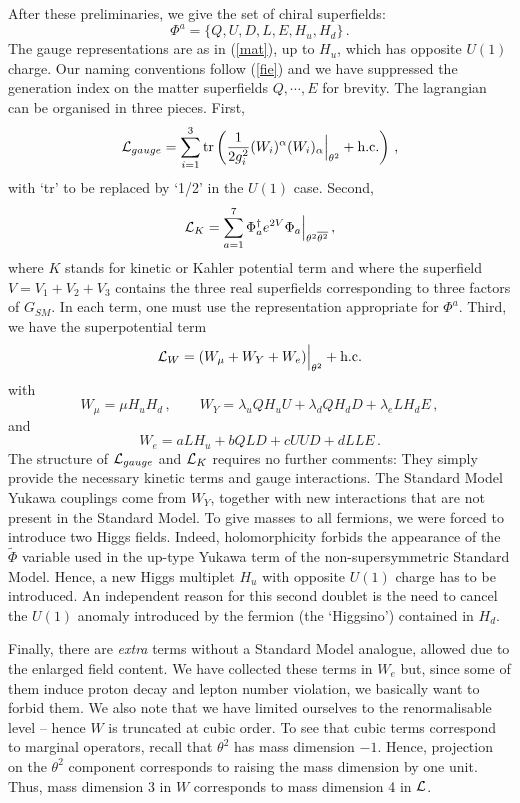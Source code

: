 \documentclass[12pt]{article}
\newcommand{\be}{\begin{equation}}
\newcommand{\ee}{\end{equation}}
\newcommand{\ol}{\overline}
\numberwithin{equation}{section}
\begin{document}
After these preliminaries, we give the set of chiral superfields:
\be
\Phi^a=\{Q,U,D,L,E,H_u,H_d\}\,.
\ee
The gauge representations are as in (\ref{mat}), up to $H_u$, which has opposite $U(1)$ charge. Our naming conventions follow (\ref{fie}) and we have suppressed the generation index on the matter superfields $Q,\cdots\!,E$ for brevity. The lagrangian can be organised in three pieces. First,
\be
{\cal L}_{gauge}=\sum_{i=1}^3\mbox{tr}\left(\frac{1}{2g_i^2}(W_i)^\alpha (W_i)_\alpha\Big|_{\theta^2}+\mbox{h.c.}
\right)\,,
\ee
with `tr' to be replaced by `1/2' in the $U(1)$ case. Second,
\be
{\cal L}_K=\sum_{a=1}^7\Phi_a^\dagger e^{2V}\Phi_a\Big|_{\theta^2\ol{\theta^2}}
\,,
\ee
where $K$ stands for kinetic or Kahler potential term and where the superfield $V=V_1+V_2+V_3$ contains the three real superfields corresponding to three factors of $G_{SM}$. In each term, one must use the representation appropriate for $\Phi^a$. Third, we have the superpotential term
\be 
{\cal L}_W=(W_\mu+W_Y+W_e)\Big|_{\theta^2}+\mbox{h.c.}
\ee
with
\be
W_\mu=\mu H_u H_d\,,\qquad W_Y=\lambda_uQH_uU+\lambda_d QH_dD+\lambda_eLH_dE\,,
\ee
and
\be
W_e=aLH_u+bQLD+cUUD+dLLE\,.
\ee
The structure of ${\cal L}_{gauge}$ and ${\cal L}_K$ requires no further comments: They simply provide the necessary kinetic terms and gauge interactions. The Standard Model Yukawa couplings come from $W_Y$, together with new interactions that are not present in the Standard Model. To give masses to all fermions, we were forced to introduce two Higgs fields. Indeed, holomorphicity forbids the appearance of the $\tilde{\Phi}$ variable used in the up-type Yukawa term of the non-supersymmetric Standard Model. Hence, a new Higgs multiplet $H_u$ with opposite $U(1)$ charge has to be introduced. An independent reason for this second doublet is the need to cancel the $U(1)$ anomaly introduced by the fermion (the `Higgsino') contained in $H_d$. 

Finally, there are {\it extra} terms without a Standard Model analogue, allowed due to the enlarged field content. We have collected these terms in $W_e$ but, since some of them induce proton decay and lepton number violation, we basically want to forbid them. We also note that we have limited ourselves to the renormalisable level -- hence $W$ is truncated at cubic order. To see that cubic terms correspond to marginal operators, recall that $\theta^2$ has mass dimension $-1$. Hence, projection on the $\theta^2$ component corresponds to raising the mass dimension by one unit. Thus, mass dimension 3 in $W$ corresponds to mass dimension 4 in ${\cal L}$. 
\end{document}
